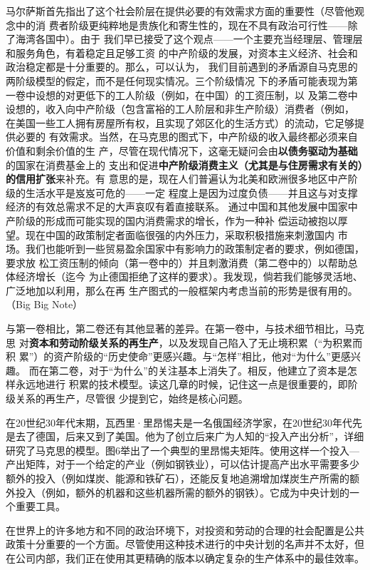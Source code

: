 马尔萨斯首先指出了这个社会阶层在提供必要的有效需求方面的重要性（尽管他观念中的消
费者阶级更纯粹地是贵族化和寄生性的，现在不具有政治可行性——除了海湾各国中）。由于
我们早已接受了这个观点——一个主要充当经理层、管理层和服务角色，有着稳定且足够工资
的中产阶级的发展，对资本主义经济、社会和政治稳定都是十分重要的。那么，可以认为，
我们目前遇到的矛盾源自马克思的两阶级模型的假定，而不是任何现实情况。三个阶级情况
下的矛盾可能表现为第一卷中设想的对更低下的工人阶级（例如，在中国）的工资压制，以
及第二卷中设想的，收入向中产阶级（包含富裕的工人阶层和非生产阶级）消费者（例如，
在美国一些工人拥有房屋所有权，且实现了郊区化的生活方式）的流动，它足够提供必要的
有效需求。当然，在马克思的图式下，中产阶级的收入最终都必须来自价值和剩余价值的生
产，尽管在现代情况下，这毫无疑问会由\textbf{以债务驱动为基础}的国家在消费基金上的
支出和促进\textbf{中产阶级消费主义（尤其是与住房需求有关的）的信用扩张}来补充。有
意思的是，现在人们普遍认为北美和欧洲很多地区中产阶级的生活水平是岌岌可危的——一定
程度上是因为过度负债——并且这与对支撑经济的有效总需求不足的大声哀叹有着直接联系。
通过中国和其他发展中国家中产阶级的形成而可能实现的国内消费需求的增长，作为一种补
偿运动被抱以厚望。现在中国的政策制定者面临很强的内外压力，采取积极措施来刺激国内
市场。我们也能听到一些贸易盈余国家中有影响力的政策制定者的要求，例如德国，要求放
松工资压制的倾向（第一卷中的）并且刺激消费（第二卷中的）以帮助总体经济增长（迄今
为止德国拒绝了这样的要求）。我发现，倘若我们能够灵活地、广泛地加以利用，那么在再
生产图式的一般框架内考虑当前的形势是很有用的。 （Big Big Note）

与第一卷相比，第二卷还有其他显著的差异。在第一卷中，与技术细节相比，马克思
对\textbf{资本和劳动阶级关系的再生产}，以及发现自己陷入了无止境积累（“为积累而积
累”）的资产阶级的“历史使命”更感兴趣。与“怎样”相比，他对“为什么”更感兴趣。
而在第二卷，对于“为什么”的关注基本上消失了。相反，他建立了资本是怎样永远地进行
积累的技术模型。读这几章的时候，记住这一点是很重要的，即阶级关系的再生产，尽管很
少提到它，始终是核心问题。

在20世纪30年代末期，瓦西里·里昂惕夫是一名俄国经济学家，在20世纪30年代先是去了德国，后来又到了美国。他为了创立后来广为人知的“投入产出分析”，详细研究了马克思的模型。图6举出了一个典型的里昂惕夫矩阵。使用这样一个投入—产出矩阵，对于一个给定的产业（例如钢铁业），可以估计提高产出水平需要多少额外的投入（例如煤炭、能源和铁矿石），还能反复地追溯增加煤炭生产所需的额外投入（例如，额外的机器和这些机器所需的额外的钢铁）。它成为中央计划的一个重要工具。

在世界上的许多地方和不同的政治环境下，对投资和劳动的合理的社会配置是公共政策十分重要的一个方面。尽管使用这种技术进行的中央计划的名声并不太好，但在公司内部，我们正在使用其更精确的版本以确定复杂的生产体系中的最佳效率。

